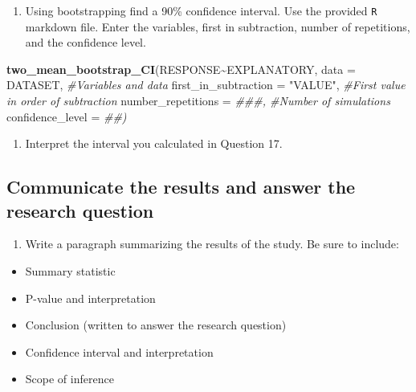 \documentclass[
]{report}
\newenvironment{Shaded}{\begin{snugshade}}{\end{snugshade}}
\newcommand{\CommentTok}[1]{\textcolor[rgb]{0.56,0.35,0.01}{\textit{#1}}}
\newcommand{\DataTypeTok}[1]{\textcolor[rgb]{0.13,0.29,0.53}{#1}}
\newcommand{\KeywordTok}[1]{\textcolor[rgb]{0.13,0.29,0.53}{\textbf{#1}}}
\newcommand{\NormalTok}[1]{#1}
\newcommand{\OperatorTok}[1]{\textcolor[rgb]{0.81,0.36,0.00}{\textbf{#1}}}
\newcommand{\StringTok}[1]{\textcolor[rgb]{0.31,0.60,0.02}{#1}}
\providecommand{\tightlist}{%
  \setlength{\itemsep}{0pt}\setlength{\parskip}{0pt}}
\begin{document}
\begin{enumerate}
\def\labelenumi{\arabic{enumi}.}
\setcounter{enumi}{16}
\tightlist
\item
  Using bootstrapping find a 90\% confidence interval. Use the provided \texttt{R} markdown file. Enter the variables, first in subtraction, number of repetitions, and the confidence level.
\end{enumerate}

\begin{Shaded}
\begin{Highlighting}[]
\KeywordTok{two\_mean\_bootstrap\_CI}\NormalTok{(RESPONSE}\OperatorTok{\textasciitilde{}}\NormalTok{EXPLANATORY, }\DataTypeTok{data =}\NormalTok{ DATASET,  }\CommentTok{\#Variables and data}
                      \DataTypeTok{first\_in\_subtraction =} \StringTok{"VALUE"}\NormalTok{, }\CommentTok{\#First value in order of subtraction}
                      \DataTypeTok{number\_repetitions =} \CommentTok{\#\#\#,  \#Number of simulations}
                      \DataTypeTok{confidence\_level =} \CommentTok{\#\#)}
\end{Highlighting}
\end{Shaded}

\begin{enumerate}
\def\labelenumi{\arabic{enumi}.}
\setcounter{enumi}{17}
\tightlist
\item
  Interpret the interval you calculated in Question 17.
\end{enumerate}

\vspace{1in}

\hypertarget{communicate-the-results-and-answer-the-research-question}{%
\subsection*{Communicate the results and answer the research question}\label{communicate-the-results-and-answer-the-research-question}}

\begin{enumerate}
\def\labelenumi{\arabic{enumi}.}
\setcounter{enumi}{18}
\tightlist
\item
  Write a paragraph summarizing the results of the study. Be sure to include:
\end{enumerate}

\begin{itemize}
\item
  Summary statistic
\item
  P-value and interpretation
\item
  Conclusion (written to answer the research question)
\item
  Confidence interval and interpretation
\item
  Scope of inference
\end{itemize}
\end{document}
